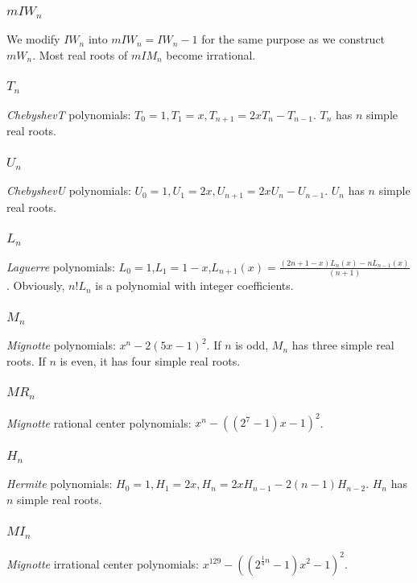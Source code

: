  \subsubsection{$ mIW_n$ }
 We modify $IW_n$  into $mIW_n=IW_n-1$ for the same purpose  as we construct $mW_n$. Most real roots of $mIM_n$  become irrational.
 \subsubsection{$T_n$} {\it ChebyshevT} polynomials: $T_0=1,T_1=x,T_{n+1}=2xT_n-T_{n-1}$. $T_n$ has $n$ simple real roots.
 \subsubsection{$U_n$} {\it ChebyshevU} polynomials: $U_0=1,U_1=2x,U_{n+1}=2xU_n-U_{n-1}$. $U_n$ has $n$ simple real roots.
 \subsubsection{$L_n$}
 {\it Laguerre}  polynomials: $L_0=1$,$L_1=1-x$,$L_{n+1}(x)=\frac{  (2n+1-x )L_n(x)-  nL_{n-1 }(x)}{(n+1) }$. %
Obviously, $n!L_n$ is a polynomial with integer coefficients.
 \subsubsection{$M_n$} {\it Mignotte} polynomials: $x^n-2(5x-1)^2$. If $n$ is odd, $M_n$ has three simple real roots. If $n$ is even, it has four simple real roots.

\subsubsection{$MR_n$}{\it Mignotte} rational center polynomials: $ x^n-((2^7-1)x-1)^2$.
	
 \subsubsection{$H_n$}{\it Hermite } polynomials:  $H_0=1,H_1=2x,H_n=2xH_{n-1}-2(n-1)H_{n-2}$. $H_n$ has $n$ simple real roots.

 \subsubsection{$MI_n$} {\it Mignotte} irrational center polynomials: $x^{129}-((2^{\frac{1}{4}n}-1)x^2-1)^2$.


